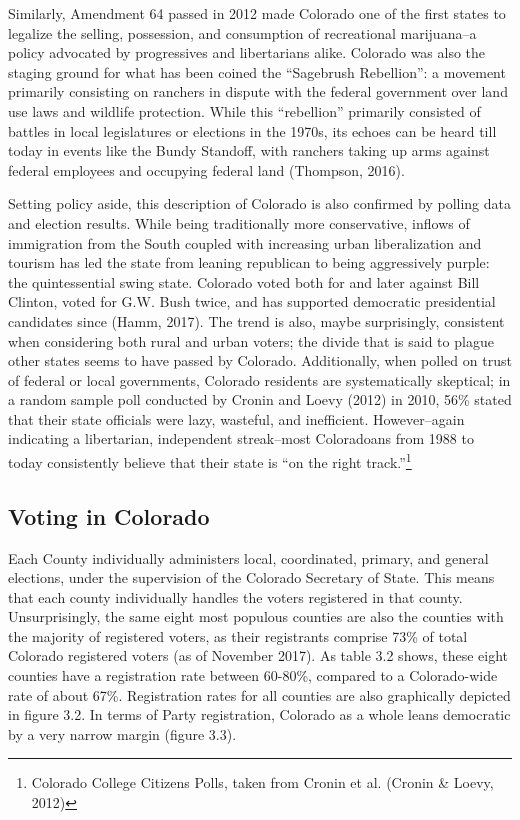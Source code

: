 \documentclass[12pt,twoside]{reedthesis}
\begin{document}
  Similarly, Amendment 64 passed in 2012 made Colorado one of the first
  states to legalize the selling, possession, and consumption of
  recreational marijuana--a policy advocated by progressives and
  libertarians alike. Colorado was also the staging ground for what has
  been coined the ``Sagebrush Rebellion'': a movement primarily consisting
  on ranchers in dispute with the federal government over land use laws
  and wildlife protection. While this ``rebellion'' primarily consisted of
  battles in local legislatures or elections in the 1970s, its echoes can
  be heard till today in events like the Bundy Standoff, with ranchers
  taking up arms against federal employees and occupying federal land
  (Thompson, 2016).
  
  Setting policy aside, this description of Colorado is also confirmed by
  polling data and election results. While being traditionally more
  conservative, inflows of immigration from the South coupled with
  increasing urban liberalization and tourism has led the state from
  leaning republican to being aggressively purple: the quintessential
  swing state. Colorado voted both for and later against Bill Clinton,
  voted for G.W. Bush twice, and has supported democratic presidential
  candidates since (Hamm, 2017). The trend is also, maybe surprisingly,
  consistent when considering both rural and urban voters; the divide that
  is said to plague other states seems to have passed by Colorado.
  Additionally, when polled on trust of federal or local governments,
  Colorado residents are systematically skeptical; in a random sample poll
  conducted by Cronin and Loevy (2012) in 2010, 56\% stated that their
  state officials were lazy, wasteful, and inefficient. However--again
  indicating a libertarian, independent streak--most Coloradoans from 1988
  to today consistently believe that their state is ``on the right
  track.''\footnote{Colorado College Citizens Polls, taken from Cronin et
    al. (Cronin \& Loevy, 2012)}
  
  \subsection{Voting in Colorado}\label{voting-in-colorado}
  
  Each County individually administers local, coordinated, primary, and
  general elections, under the supervision of the Colorado Secretary of
  State. This means that each county individually handles the voters
  registered in that county. Unsurprisingly, the same eight most populous
  counties are also the counties with the majority of registered voters,
  as their registrants comprise 73\% of total Colorado registered voters
  (as of November 2017). As table 3.2 shows, these eight counties have a
  registration rate between 60-80\%, compared to a Colorado-wide rate of
  about 67\%. Registration rates for all counties are also graphically
  depicted in figure 3.2. In terms of Party registration, Colorado as a
  whole leans democratic by a very narrow margin (figure 3.3).
  
\end{document}

